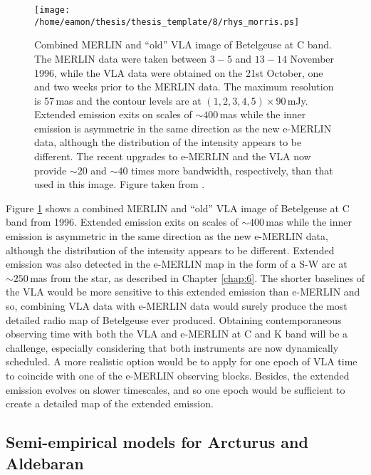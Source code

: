 \begin{figure}[!ht]
\centering 
        \texttt{[image: /home/eamon/thesis/thesis\_template/8/rhys\_morris.ps]}
\caption[MERLIN $+$ ``old'' VLA image of Betelgeuse]{Combined MERLIN and ``old'' VLA image of Betelgeuse at C band. The MERLIN data were taken between $3-5$ and $13-14$ November 1996, while the VLA data were obtained on the 21st October, one and two weeks prior to the MERLIN data. The maximum resolution is 57\,mas and the contour levels are at $(1,2,3,4,5)\times 90\,$mJy. Extended emission exits on scales of $\sim 400$\,mas while the inner emission is asymmetric in the same direction as the new e-MERLIN data, although the distribution of the intensity appears to be different. The recent upgrades to e-MERLIN and the VLA now provide $\sim 20$ and $\sim 40$ times more bandwidth, respectively, than that used in this image. Figure taken from \cite{morris_2001}.} 
\label{fig:8.3}
\end{figure}

Figure \ref{fig:8.3} shows a combined MERLIN and ``old'' VLA image of Betelgeuse at C band from 1996. Extended emission exits on scales of $\sim 400$\,mas while the inner emission is asymmetric in the same direction as the new e-MERLIN data, although the distribution of the intensity appears to be different. Extended emission was also detected in the e-MERLIN map in the form of a S-W arc at $\sim 250$\,mas from the star, as described in Chapter \ref{chap:6}. The shorter baselines of the VLA would be more sensitive to this extended emission than e-MERLIN and so, combining VLA data with e-MERLIN data would surely produce the most detailed radio map of Betelgeuse ever produced. Obtaining contemporaneous observing time with both the VLA and e-MERLIN at C and K band will be a challenge, especially considering that both instruments are now dynamically scheduled. A more realistic option would be to apply for one epoch of VLA time to coincide with one of the e-MERLIN observing blocks. Besides, the extended emission evolves on slower timescales, and so one epoch would be sufficient to create a detailed map of the extended emission.

\subsection{Semi-empirical models for Arcturus and Aldebaran}\label{sec:8.2.3}

